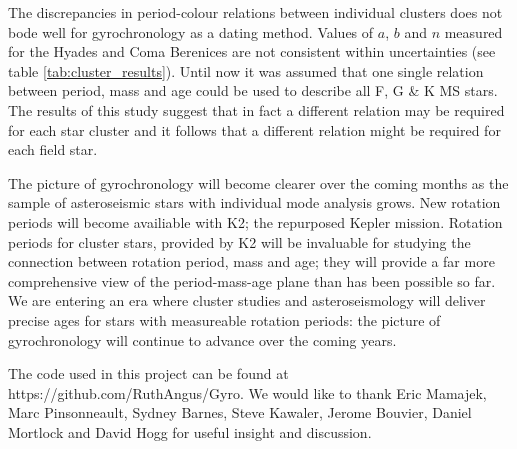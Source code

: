 \documentclass[10pt,preprint]{aastex}
\begin{document}
The discrepancies in period-colour relations between individual clusters does not bode well for gyrochronology as a dating method.
Values of $a$, $b$ and $n$ measured for the Hyades and Coma Berenices are not consistent within uncertainties (see table \ref{tab:cluster_results}).
Until now it was assumed that one single relation between period, mass and age could be used to describe all F, G \& K MS stars.
The results of this study suggest that in fact a different relation may be required for each star cluster and it follows that a different relation might be required for each field star.


The picture of gyrochronology  will become clearer over the coming months as the sample of asteroseismic stars with individual mode analysis grows.
New rotation periods will become availiable with K2; the repurposed Kepler mission.
Rotation periods for cluster stars, provided by K2 will be invaluable for studying the connection between rotation period, mass and age; they will provide a far more comprehensive view of the period-mass-age plane than has been possible so far.
We are entering an era where cluster studies and asteroseismology will deliver precise ages for stars with measureable rotation periods: the picture of gyrochronology will continue to advance over the coming years.

The code used in this project can be found at https://github.com/RuthAngus/Gyro.
We would like to thank Eric Mamajek, Marc Pinsonneault, Sydney Barnes, Steve Kawaler, Jerome Bouvier, Daniel Mortlock and David Hogg for useful insight and discussion.



\end{document}
